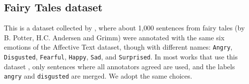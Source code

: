 \documentclass[11pt]{article}
\newcommand{\note}[1]{\textbf{*** #1 ***}}
\begin{document}
%




\subsection{Fairy Tales dataset}
This is a dataset collected by , where about 1,000 sentences from fairy tales (by B. Potter, H.C. Andersen and Grimm) were annotated with the same six emotions of the Affective Text dataset, though with different names: \texttt{Angry}, \texttt{Disgusted}, \texttt{Fearful}, \texttt{Happy}, \texttt{Sad}, and \texttt{Surprised}. In most works that use this dataset \cite{kim2010evaluation,chaffar2011using,calvo2013emotions}, only sentences where all annotators agreed are used, and the labels \texttt{angry} and \texttt{disgusted} are merged. We adopt the same choices. 



 


\end{document}

